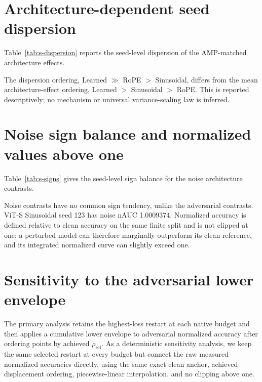 \documentclass[preprint,12pt,authoryear]{elsarticle}
\begin{document}
\section{Architecture-dependent seed dispersion}

Table~\ref{tab:s-dispersion} reports the seed-level dispersion of the
AMP-matched architecture effects.



The dispersion ordering, Learned $\gg$ RoPE $>$ Sinusoidal, differs from
the mean architecture-effect ordering, Learned $>$ Sinusoidal $>$ RoPE.
This is reported descriptively; no mechanism or universal variance-scaling
law is inferred.

\section{Noise sign balance and normalized values above one}

Table~\ref{tab:s-signs} gives the seed-level sign balance for the noise
architecture contrasts.



Noise contrasts have no common sign tendency, unlike the adversarial
contrasts. ViT-S Sinusoidal seed 123 has noise nAUC 1.0009374. Normalized
accuracy is defined relative to clean accuracy on the same finite split
and is not clipped at one; a perturbed model can therefore marginally
outperform its clean reference, and its integrated normalized curve can
slightly exceed one.


\section{Sensitivity to the adversarial lower envelope}
\label{sec:s-no-envelope}

The primary analysis retains the highest-loss restart at each native budget
and then applies a cumulative lower envelope to adversarial normalized
accuracy after ordering points by achieved $\rho_{\mathrm{rel}}$. As a
deterministic sensitivity analysis, we keep the same selected restart at
every budget but connect the raw measured normalized accuracies directly,
using the same exact clean anchor, achieved-displacement ordering,
piecewise-linear interpolation, and no clipping above one.


\end{document}
